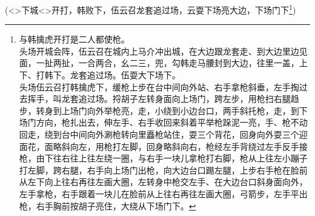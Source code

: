{





(\textless{}\!\textgreater{}{\hwfs 下城}\textless{}\!\textgreater{}{\hwfs 开打}，韩{\hwfs 败下}，伍云召{\hwfs 龙套追过场}，云{\hwfs 耍下场亮大边}，{\hwfs 下场门下}\footnote{{\hei 与韩擒虎开打是二人都使枪}。\\{\hwl 头场开城会阵}，伍云召{\hwfs 在城内上马介冲出城}，{\hwl 在大边跟龙套走}、{\hwl 到大边里边见面}，{\hwl 一扯两扯}，{\hwl 一合两合}，{\hwl 幺二三}，{\hwl 兜}，{\hwl 勾}韩{\hwl 走马腰封到大边}，{\hwl 往里一盖}，{\hwl 上下}、{\hwl 打}韩{\hwl 下}。龙套{\hwl 追过场}。伍{\hwl 耍大下场下}。\\{\hwfs 头场}伍云召{\hwfs 打}韩擒虎{\hwfs 下}，{\hwl 缓枪上步在台中间向外站}、{\hwl 右手拿枪斜垂}，{\hwl 左手掏过去挥手}，{\hwl 叫}龙套{\hwl 追过场}。{\hwl 捋胡子左转身面向上场门}，{\hwl 跨左步}，{\hwl 用枪扫右腿趋步}，{\hwl 转身到上场门向外举枪亮}，{\hwl 走}，{\hwl 小绕到小边台口}，{\hwl 两手斜托枪}，{\hwl 走}，{\hwl 到下场门方向}，{\hwl 枪扎出去}，{\hwl 伸左手}、{\hwl 右手收回来斜着平举枪跺泥一亮}，{\hwl 手}、{\hwl 枪不动回走}，{\hwl 绕到台中间向外涮枪转向里矗枪站住}，{\hwl 耍三个背花}，{\hwl 回身向外耍三个迎面花}，{\hwl 面略斜向左}，{\hwl 用枪打左脚}，{\hwl 回身略斜向右}，{\hwl 枪经左手背绕过左手反手接枪}，{\hwl 由下往右往上往左绕一圈}，{\hwl 与右手一块儿拿枪打右脚}，{\hwl 枪从上往左小蹦子打左脚}，{\hwl 跨右腿}，{\hwl 右手向上场门出枪}，{\hwl 向大边台口踢左腿}，{\hwl 上步右手枪在脸前从左下向上往右再往左画大圈}，{\hwl 左转身中枪交左手}、{\hwl 在大边台口斜身面向外}，{\hwl 左手拿枪}，{\hwl 右手跟着一块儿在脸前从上往右再往左画大圈}，{\hwl 弓箭步}，{\hwl 左手平出枪}，{\hwl 右手胸前按胡子亮住}，{\hwl 大绕从下场门下。}})

\vspace{5pt}

}
